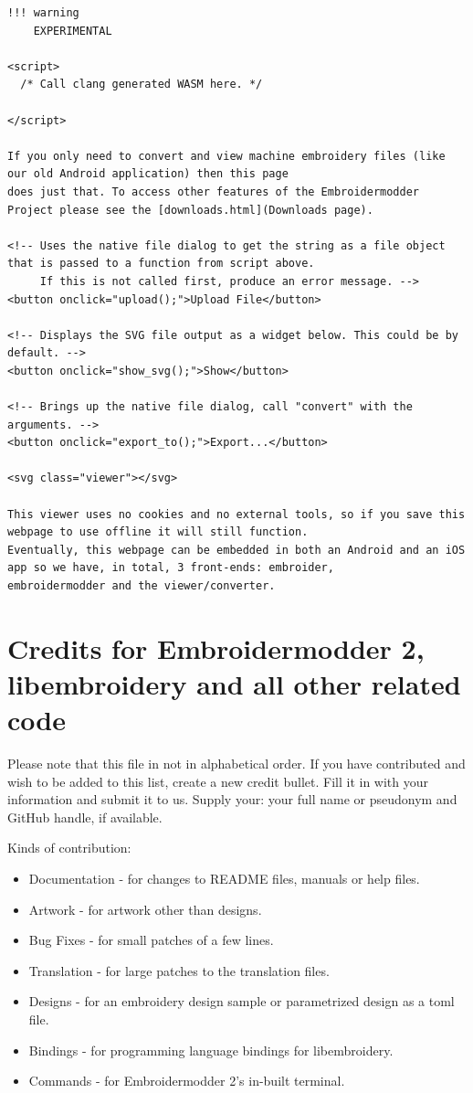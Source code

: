 \begin{verbatim}
!!! warning
    EXPERIMENTAL

<script>
  /* Call clang generated WASM here. */
  
</script>

If you only need to convert and view machine embroidery files (like our old Android application) then this page
does just that. To access other features of the Embroidermodder Project please see the [downloads.html](Downloads page).

<!-- Uses the native file dialog to get the string as a file object that is passed to a function from script above.
     If this is not called first, produce an error message. -->
<button onclick="upload();">Upload File</button>

<!-- Displays the SVG file output as a widget below. This could be by default. -->
<button onclick="show_svg();">Show</button>

<!-- Brings up the native file dialog, call "convert" with the arguments. -->
<button onclick="export_to();">Export...</button>

<svg class="viewer"></svg>

This viewer uses no cookies and no external tools, so if you save this webpage to use offline it will still function.
Eventually, this webpage can be embedded in both an Android and an iOS app so we have, in total, 3 front-ends: embroider,
embroidermodder and the viewer/converter.
\end{verbatim}

\section{Credits for Embroidermodder 2, libembroidery and all other related code}

Please note that this file in not in alphabetical order. If you have
contributed and wish to be added to this list, create a new credit
bullet. Fill it in with your information and submit it to us. Supply
your: your full name or pseudonym and GitHub handle, if available.

Kinds of contribution:

\begin{itemize}
\item Documentation - for changes to README files, manuals or help files.
\item Artwork - for artwork other than designs.
\item Bug Fixes - for small patches of a few lines.
\item Translation - for large patches to the translation files.
\item Designs - for an embroidery design sample or parametrized design as a toml file.
\item Bindings - for programming language bindings for libembroidery.
\item Commands - for Embroidermodder 2's in-built terminal.
\end{itemize}

